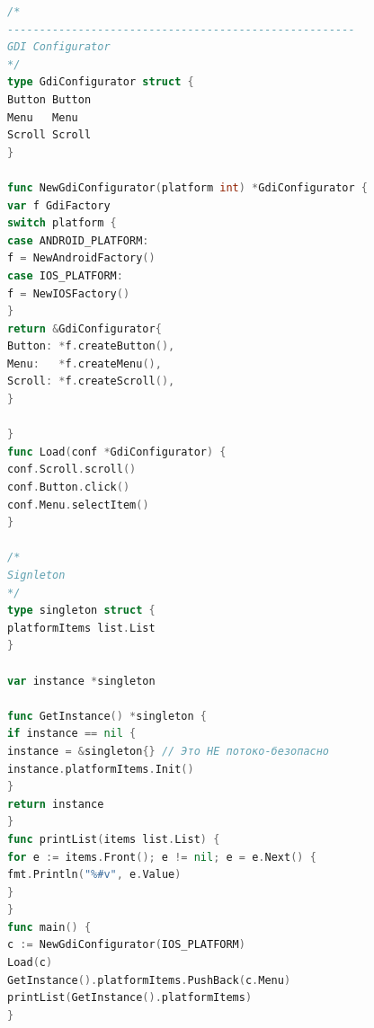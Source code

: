 \documentclass[PI,LAB]{HSEUniversity}
\begin{document}
\begin{lstlisting}[language=Go]
/*
------------------------------------------------------
GDI Configurator
*/
type GdiConfigurator struct {
Button Button
Menu   Menu
Scroll Scroll
}

func NewGdiConfigurator(platform int) *GdiConfigurator {
var f GdiFactory
switch platform {
case ANDROID_PLATFORM:
f = NewAndroidFactory()
case IOS_PLATFORM:
f = NewIOSFactory()
}
return &GdiConfigurator{
Button: *f.createButton(),
Menu:   *f.createMenu(),
Scroll: *f.createScroll(),
}

}
func Load(conf *GdiConfigurator) {
conf.Scroll.scroll()
conf.Button.click()
conf.Menu.selectItem()
}

/*
Signleton
*/
type singleton struct {
platformItems list.List
}

var instance *singleton

func GetInstance() *singleton {
if instance == nil {
instance = &singleton{} // Это НЕ потоко-безопасно
instance.platformItems.Init()
}
return instance
}
func printList(items list.List) {
for e := items.Front(); e != nil; e = e.Next() {
fmt.Println("%#v", e.Value)
}
}
func main() {
c := NewGdiConfigurator(IOS_PLATFORM)
Load(c)
GetInstance().platformItems.PushBack(c.Menu)
printList(GetInstance().platformItems)
}


\end{lstlisting}
\end{document}
